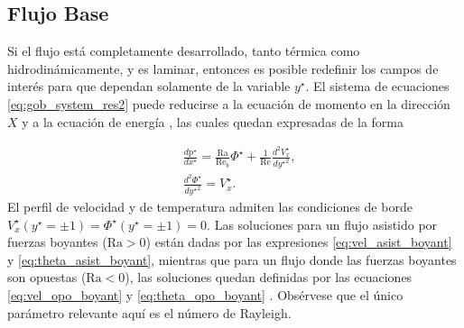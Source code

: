 \subsection{Flujo Base}

Si el flujo está completamente desarrollado, tanto térmica como hidrodinámicamente, y es laminar, entonces es posible redefinir los campos de interés para que dependan solamente de la variable $y^{\star}$. El sistema de ecuaciones \ref{eq:gob_system_res2} puede reducirse a la ecuación de momento en la dirección $X$ y a la ecuación de energía \cite{chen1996linear}, las cuales quedan expresadas de la forma 

\begin{align}
&\frac{d \text{p}^{\star} }{d x^{\star}} = \frac{\text{Ra}}{\text{Re}_b } \Phi^{\star} + \frac{1}{\text{Re}} \frac{d^2 V^{\star}_x}{d {y^{\star}}^2}, \\
&\frac{d^2 \Phi^{\star}}{ d {y^{\star}}^2 } =  V^{\star}_x \text{.}
\label{eq:base1}
\end{align}
El perfil de velocidad y de temperatura admiten las condiciones de borde \linebreak  $V^{\star}_x({y^{\star}}= \pm 1) = \Phi^{\star} ({y^{\star}}= \pm 1) = 0 $. Las soluciones para un flujo asistido por fuerzas boyantes ($\text{Ra}>0$) están dadas por las expresiones \ref{eq:vel_asist_boyant} y \ref{eq:theta_asist_boyant}, mientras que para un flujo donde las fuerzas boyantes son opuestas ($\text{Ra}<0$), las soluciones quedan definidas por las ecuaciones \ref{eq:vel_opo_boyant} y \ref{eq:theta_opo_boyant} \cite{chen1996linear}. Obsérvese que el único parámetro relevante aquí es el número de Rayleigh.
